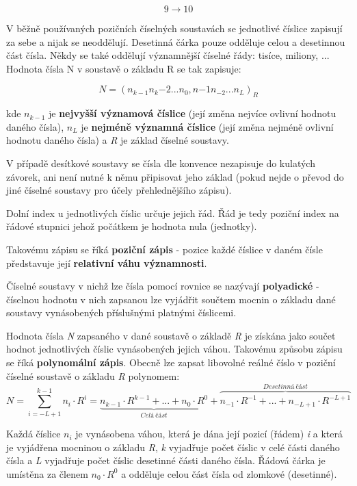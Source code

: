 $$ 9 \rightarrow 10 $$


V běžně používaných pozičních číselných soustavách se jednotlivé číslice zapisují za sebe a nijak se neoddělují. Desetinná čárka pouze odděluje celou a desetinnou část čísla. Někdy se také oddělují významnější číselné řády: tisíce, miliony, ...  Hodnota čísla N v soustavě o základu R se tak zapisuje:

$$ N = (n_{k-1} n_k{-2}... n_0, n{-1} n_{-2}...n_L)_R $$

kde $n_{k-1}$ je {\bf nejvyšší významová číslice} (její změna nejvíce ovlivní hodnotu daného čísla), $n_L$ je {\bf nejméně významná číslice} (její změna nejméně ovlivní hodnotu daného čísla) a {\it R} je základ číselné soustavy.

V případě desítkové soustavy se čísla dle konvence nezapisuje do kulatých závorek, ani není nutné k němu připisovat jeho základ (pokud nejde o převod do jiné číselné soustavy pro účely přehlednějšího zápisu).

Dolní index u jednotlivých číslic určuje jejich řád. Řád je tedy poziční index na řádové stupnici jehož počátkem je hodnota nula (jednotky).

\vskip 4mm
\centerline{}
\vskip 4mm

Takovému zápisu se říká {\bf poziční zápis} - pozice každé číslice v daném čísle představuje její {\bf relativní váhu významnosti}.

Číselné soustavy v nichž lze čísla pomocí rovnice se nazývají {\bf polyadické} - číselnou hodnotu v nich zapsanou lze vyjádřit součtem mocnin o základu dané soustavy vynásobených příslušnými platnými číslicemi.


Hodnota čísla {\it N} zapsaného v dané soustavě o základě {\it R} je získána jako součet hodnot jednotlivých číslic vynásobených jejich váhou. Takovému způsobu zápisu se říká {\bf polynomální zápis}. Obecně lze zapsat libovolné reálné číslo v poziční číselné soustavě o základu {\it R} polynomem:
{
\tiny
$$ N=\sum_{i=-L+1}^{k-1} n_i \cdot R^i = \underbrace{n_{k-1} \cdot R^{k-1} + ... + n_{0} \cdot R^{0}}_{Celá~část} + \overbrace{n_{-1} \cdot R^{-1} + ... + n_{-L+1}\cdot R^{-L+1}}^{Desetinná~část}$$
}

Každá číslice $n_i$ je vynásobena váhou, která je dána její pozicí (řádem) {\it i} a která je vyjádřena mocninou o základu {\it R}, {\it k} vyjadřuje počet číslic v celé části daného čísla a {\it L} vyjadřuje počet číslic desetinné části daného čísla. Řádová čárka je umístěna za členem $n_0\cdot R^0$ a odděluje celou část čísla od zlomkové (desetinné).

